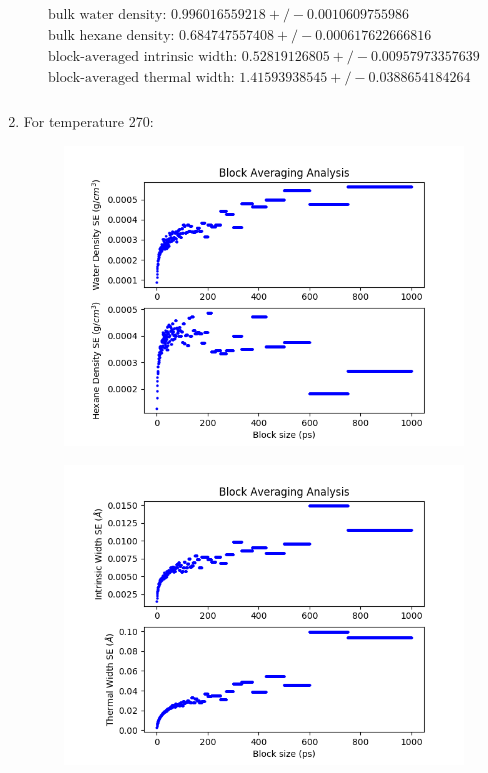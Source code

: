 \documentclass[12pt,reqno]{amsart}
\numberwithin{equation}{section}
\begin{document}
\begin{enumerate}
\begin{align}
\begin{split}
\text{bulk water density: } 0.996016559218  +/- 0.0010609755986 \\
\text{bulk hexane density: } 0.684747557408  +/- 0.000617622666816 \\
\text{block-averaged intrinsic width: } 0.52819126805  +/- 0.00957973357639\\
\text{block-averaged thermal width: } 1.41593938545  +/- 0.0388654184264 \\
\end{split}
\end{align} 

\item For temperature 270:

\begin{figure}[H]
\centering
\includegraphics[scale=0.6]{density_profile_block_averaging_1_full-270-1bead}
\end{figure}

\begin{figure}[H]
\centering
\includegraphics[scale=0.6]{density_profile_block_averaging_2_full-270-1bead}
\end{figure}


\end{enumerate}
\end{document}
